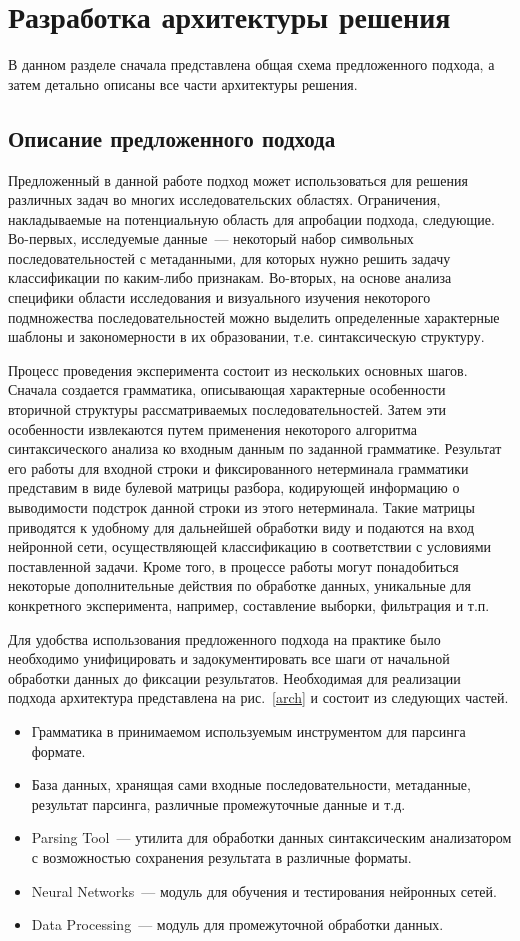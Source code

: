 \section{Разработка архитектуры решения}
В данном разделе сначала представлена общая схема предложенного подхода, а затем детально описаны все части архитектуры решения.
\subsection{Описание предложенного подхода}
Предложенный в данной работе подход может использоваться для решения различных задач во многих исследовательских областях. Ограничения, накладываемые на потенциальную область для апробации подхода, следующие. Во-первых, исследуемые данные~--- некоторый набор символьных последовательностей с метаданными, для которых нужно решить задачу классификации по каким-либо признакам. Во-вторых, на основе анализа специфики области исследования и визуального изучения некоторого подмножества последовательностей можно выделить определенные характерные шаблоны и закономерности в их образовании, т.е. синтаксическую структуру.

Процесс проведения эксперимента состоит из нескольких основных шагов. Сначала создается грамматика, описывающая характерные особенности вторичной структуры рассматриваемых последовательностей. Затем эти особенности извлекаются путем применения некоторого алгоритма синтаксического анализа ко входным данным по заданной грамматике. Результат его работы для входной строки и фиксированного нетерминала грамматики представим в виде булевой матрицы разбора, кодирующей информацию о выводимости подстрок данной строки из этого нетерминала. Такие матрицы приводятся к удобному для дальнейшей обработки виду и подаются на вход нейронной сети, осуществляющей классификацию в соответствии с условиями поставленной задачи. Кроме того, в процессе работы могут понадобиться некоторые дополнительные действия по обработке данных, уникальные для конкретного эксперимента, например, составление выборки, фильтрация и т.п.

Для удобства использования предложенного подхода на практике было необходимо унифицировать и задокументировать все шаги от начальной обработки данных до фиксации результатов. Необходимая для реализации подхода архитектура представлена на рис.~\ref{arch} и состоит из следующих частей.
\begin{itemize}
    \item Грамматика в принимаемом используемым инструментом для парсинга формате.
    \item База данных, хранящая сами входные последовательности, метаданные, результат парсинга, различные промежуточные данные и т.д.
    \item Parsing Tool~--- утилита для обработки данных синтаксическим анализатором с возможностью сохранения результата в различные форматы.
    \item Neural Networks~--- модуль для обучения и тестирования нейронных сетей.
    \item Data Processing~--- модуль для промежуточной обработки данных.
\end{itemize}

